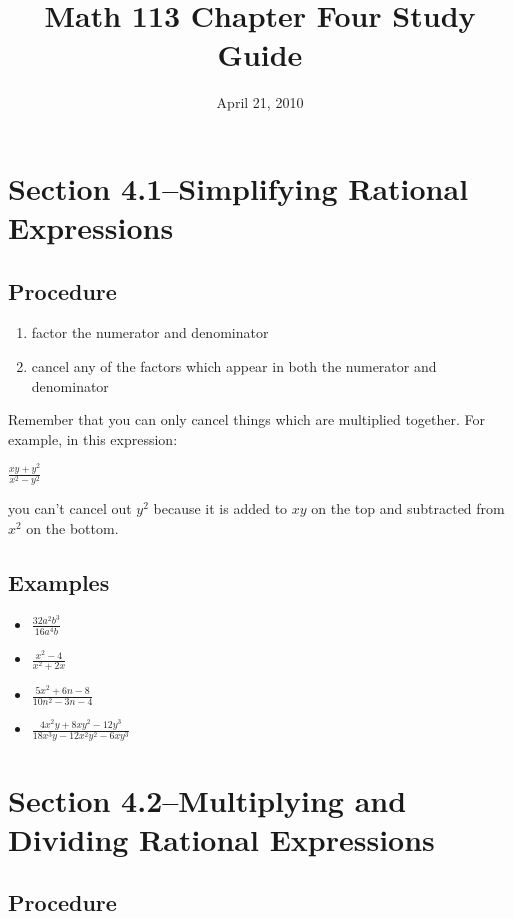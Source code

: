 \documentclass[fleqn,addpoints]{exam}
\title{Math 113 Chapter Four Study Guide}
\author{}
\date{April 21, 2010}
\begin{document}
\maketitle

\section{Section 4.1--Simplifying Rational Expressions}

\subsection{Procedure}

\begin{enumerate}
  \item factor the numerator and denominator
  \item cancel any of the factors which appear in both the numerator and denominator
\end{enumerate}

Remember that you can only cancel things which are multiplied together.  For example, in this expression:

\( \displaystyle \frac{xy+y^2}{x^2-y^2} \)

you can't cancel out $y^2$ because it is added to $xy$ on the top and subtracted from $x^2$ on the bottom.

\subsection{Examples}

\begin{itemize}
  \item \( \displaystyle \frac{32a^2b^3}{16a^4b} \)
  \item \( \displaystyle \frac{x^2-4}{x^2+2x} \)
  \item \( \displaystyle\frac{5x^2+6n-8}{10n^2-3n-4} \)
  \item \( \displaystyle\frac{4x^2y+8xy^2-12y^3}{18x^3y-12x^2y^2-6xy^3} \)
\end{itemize}

\section{Section 4.2--Multiplying and Dividing Rational Expressions}

\subsection{Procedure}
\end{document}
